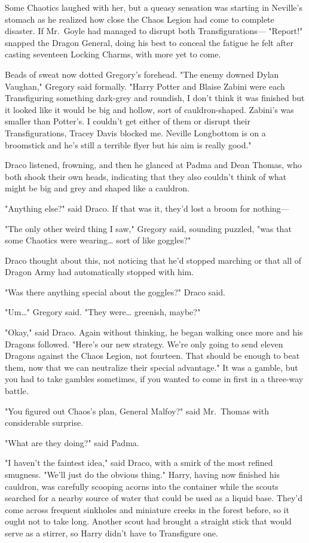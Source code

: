 Some Chaotics laughed with her, but a queasy sensation was starting in
Neville's stomach as he realized how close the Chaos Legion had come to
complete disaster. If Mr.~Goyle had managed to disrupt both Transfigurations---
\later
"Report!" snapped the Dragon General, doing his best to conceal the fatigue he
felt after casting seventeen Locking Charms, with more yet to come.

Beads of sweat now dotted Gregory's forehead. "The enemy downed Dylan Vaughan,"
Gregory said formally. "Harry Potter and Blaise Zabini were each Transfiguring
something dark-grey and roundish, I don't think it was finished but it looked
like it would be big and hollow, sort of cauldron-shaped. Zabini's was smaller
than Potter's. I couldn't get either of them or disrupt their Transfigurations,
Tracey Davis blocked me. Neville Longbottom is on a broomstick and he's still a
terrible flyer but his aim is really good."

Draco listened, frowning, and then he glanced at Padma and Dean Thomas, who
both shook their own heads, indicating that they also couldn't think of what
might be big and grey and shaped like a cauldron.

"Anything else?" said Draco. If that was it, they'd lost a broom for nothing---

"The only other weird thing I saw," Gregory said, sounding puzzled, "was that
some Chaotics were wearing{\ldots} sort of like goggles?"

Draco thought about this, not noticing that he'd stopped marching or that all
of Dragon Army had automatically stopped with him.

"Was there anything special about the goggles?" Draco said.

"Um{\ldots}" Gregory said. "They were{\ldots} greenish, maybe?"

"Okay," said Draco. Again without thinking, he began walking once more and his
Dragons followed. "Here's our new strategy. We're only going to send eleven
Dragons against the Chaos Legion, not fourteen. That should be enough to beat
them, now that we can neutralize their special advantage." It was a gamble, but
you had to take gambles sometimes, if you wanted to come in first in a
three-way battle.

"You figured out Chaos's plan, General Malfoy?" said Mr.~Thomas with
considerable surprise.

"What are they doing?" said Padma.

"I haven't the faintest idea," said Draco, with a smirk of the most refined
smugness. "We'll just do the obvious thing."
\later
Harry, having now finished his cauldron, was carefully scooping acorns into the
container while the scouts searched for a nearby source of water that could be
used as a liquid base. They'd come across frequent sinkholes and miniature
creeks in the forest before, so it ought not to take long. Another scout had
brought a straight stick that would serve as a stirrer, so Harry didn't have to
Transfigure one.

